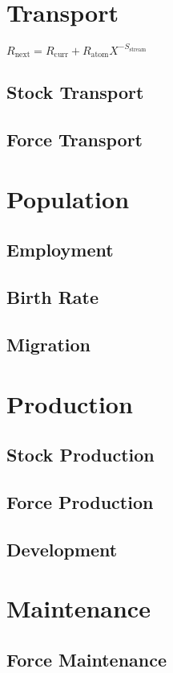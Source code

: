 \documentclass[a4paper,oneside,titlepage]{report}
\begin{document}
\section{Transport}
$R_{\mathrm{next}} = R_{\mathrm{curr}} + R_{\mathrm{atom}} X^{-S_{\mathrm{stream}}}$
\subsection{Stock Transport}
\subsection{Force Transport} 

\section{Population}
\subsection{Employment}
\subsection{Birth Rate}
\subsection{Migration}

\section{Production}
\subsection{Stock Production}
\subsection{Force Production} 
\subsection{Development}

\section{Maintenance}
\subsection{Force Maintenance}  
\end{document}
